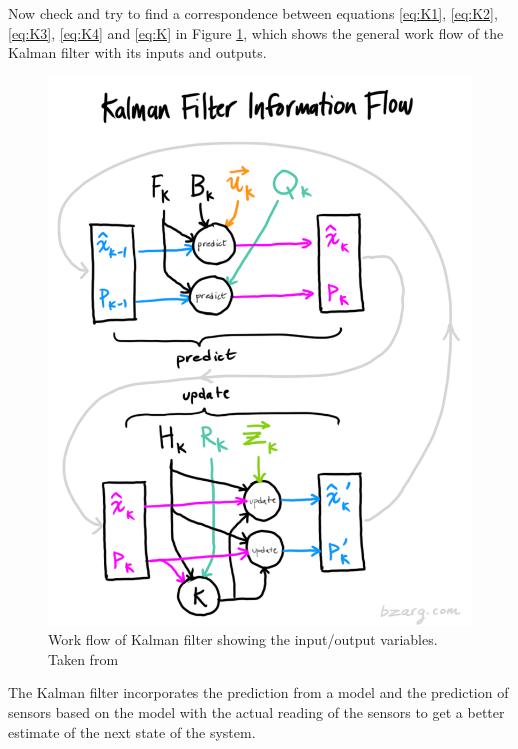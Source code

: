 \documentclass[12pt,a4paper,final]{article} %
\begin{document}
Now check and try to find a correspondence between equations
\eqref{eq:K1}, \eqref{eq:K2}, \eqref{eq:K3}, \eqref{eq:K4} and
\eqref{eq:K} in Figure \ref{fig:kalman_workflow}, which shows the
general work flow of the Kalman filter with its inputs and outputs.
\begin{figure}
  \centering
  \includegraphics[width=1.0
 \textwidth]{kalflow}
 \caption{Work flow of Kalman filter showing the input/output
   variables. Taken from \cite{Bzarg:2011:URL}}
  \label{fig:kalman_workflow}
\end{figure}

The Kalman filter incorporates the prediction from a model and the
prediction of sensors based on the model with the actual reading of
the sensors to get a better estimate of the next state of the system.
\end{document}
